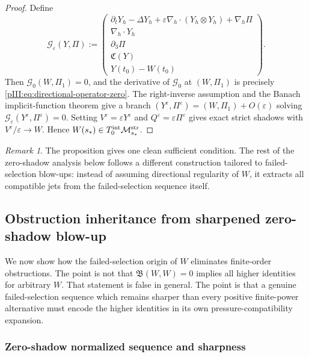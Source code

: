\documentclass[11pt]{article}
\numberwithin{equation}{section}
\theoremstyle{plain}
\theoremstyle{definition}
\theoremstyle{remark}
\newtheorem{remark}{Remark}[section]
\newcommand{\eps}{\varepsilon}
\newcommand{\nabh}{\nabla_h}
\newcommand{\divh}{\nabla_h\!\cdot}
\newcommand{\Mstr}{\mathcal M^{\rm str}}
\newcommand{\Tint}{T^{\rm int}}
\newcommand{\calB}{\mathfrak B}
\newcommand{\calC}{\mathfrak C}
\newcommand{\calG}{\mathcal G}
\begin{document}
\begin{proof}
Define
\[
        \calG_\eps(Y,\Pi)
        :=
        \begin{pmatrix}
        \partial_tY_h-\Delta Y_h+
        \eps\nabh\cdot(Y_h\otimes Y_h)+\nabh\Pi\\
        \divh Y_h\\
        \partial_3\Pi\\
        \calC(Y)\\
        Y(t_0)-W(t_0)
        \end{pmatrix}.
\]
Then \(\calG_0(W,\Pi_1)=0\), and the derivative of \(\calG_0\) at \((W,\Pi_1)\)
is precisely \eqref{pIII:eq:directional-operator-zero}.  The right-inverse assumption and the
Banach implicit-function theorem give a branch \((Y^\eps,\Pi^\eps)=(W,\Pi_1)+O(\eps)\)
solving \(\calG_\eps(Y^\eps,\Pi^\eps)=0\).  Setting
\(V^\eps=\eps Y^\eps\) and \(Q^\eps=\eps\Pi^\eps\) gives exact strict shadows with
\(V^\eps/\eps\to W\).  Hence \(W(s_*)\in\Tint_0\Mstr_{s_*}\).
\end{proof}

\begin{remark}
The proposition gives one clean sufficient condition.  The rest of the zero-shadow analysis
below follows a different construction tailored to failed-selection blow-ups: instead of assuming
directional regularity of \(W\), it extracts all compatible jets from the failed-selection
sequence itself.
\end{remark}

\subsection{Obstruction inheritance from sharpened zero-shadow blow-up}\label{pIII:sec:obstruction-inheritance}

We now show how the failed-selection origin of \(W\) eliminates finite-order obstructions.
The point is not that \(\calB(W,W)=0\) implies all higher identities for arbitrary \(W\).
That statement is false in general.  The point is that a genuine failed-selection sequence
which remains sharper than every positive finite-power alternative must encode the higher
identities in its own pressure-compatibility expansion.

\subsubsection{Zero-shadow normalized sequence and sharpness}
\end{document}

